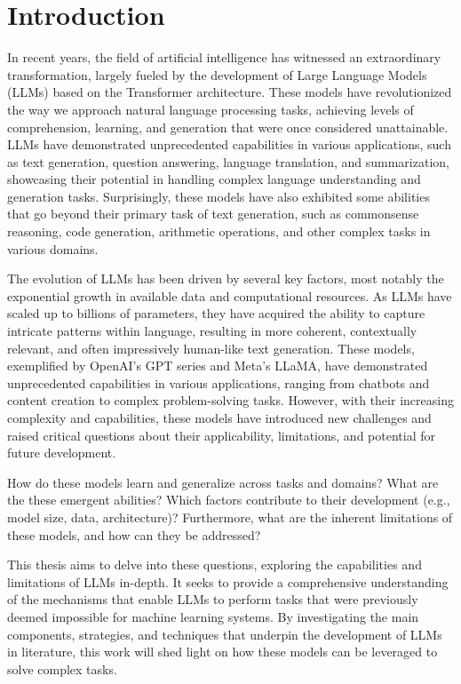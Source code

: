 

\chapter*{Introduction}

In recent years, the field of artificial intelligence has witnessed an extraordinary transformation, largely fueled by the development of Large Language Models (LLMs) based on the Transformer architecture.
These models have revolutionized the way we approach natural language processing tasks, achieving levels of comprehension, learning, and generation that were once considered unattainable.
LLMs have demonstrated unprecedented capabilities in various applications, such as text generation, question answering, language translation, and summarization, showcasing their potential in handling complex language understanding and generation tasks.
Surprisingly, these models have also exhibited some abilities that go beyond their primary task of text generation, such as commonsense reasoning, code generation, arithmetic operations, and other complex tasks in various domains.

The evolution of LLMs has been driven by several key factors, most notably the exponential growth in available data and computational resources.
As LLMs have scaled up to billions of parameters, they have acquired the ability to capture intricate patterns within language, resulting in more coherent, contextually relevant, and often impressively human-like text generation.
These models, exemplified by OpenAI's GPT series and Meta's LLaMA, have demonstrated unprecedented capabilities in various applications, ranging from chatbots and content creation to complex problem-solving tasks.
However, with their increasing complexity and capabilities, these models have introduced new challenges and raised critical questions about their applicability, limitations, and potential for future development.

How do these models learn and generalize across tasks and domains?
What are the these emergent abilities?
Which factors contribute to their development (e.g., model size, data, architecture)?
Furthermore, what are the inherent limitations of these models, and how can they be addressed?

This thesis aims to delve into these questions, exploring the capabilities and limitations of LLMs in-depth.
It seeks to provide a comprehensive understanding of the mechanisms that enable LLMs to perform tasks that were previously deemed impossible for machine learning systems.
By investigating the main components, strategies, and techniques that underpin the development of LLMs in literature, this work will shed light on how these models can be leveraged to solve complex tasks.


